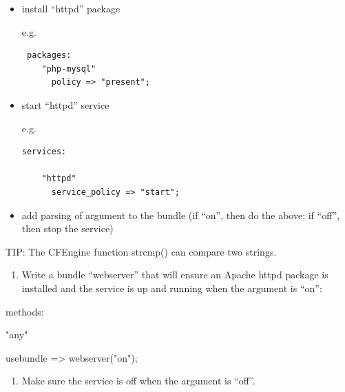 \begin{aside}
\label{aside:exercise_38}

\begin{itemize}
\item{} install ``httpd'' package

e.g.

\begin{verbatim}
 packages:
    "php-mysql"
      policy => "present";
\end{verbatim}
\item{} start ``httpd'' service

e.g.

\begin{verbatim}
services:

    "httpd"
      service_policy => "start";
\end{verbatim}
\item{} add parsing of argument to the bundle (if ``on'', then do the above;
if ``off'', then stop the service)
\end{itemize}

TIP: The CFEngine function strcmp() can compare two strings.

\begin{enumerate}
\item{} Write a bundle ``webserver'' that will ensure an Apache httpd package
is installed and the service is up and running when the argument is
``on'':
\end{enumerate}

\begin{code}

     methods:

        "any"

             usebundle => webserver("on");
\end{code}

\begin{enumerate}
\item{} Make sure the service is off when the argument is ``off''.
\end{enumerate}

\end{aside}